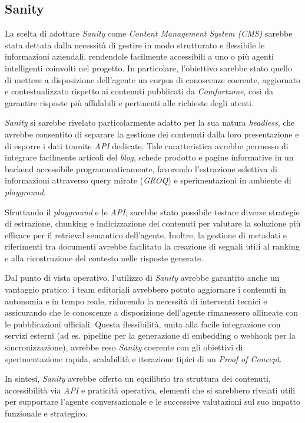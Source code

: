 \subsection{Sanity}

La scelta di adottare \emph{Sanity} come \emph{Content Management System (CMS)} sarebbe stata dettata dalla necessità di gestire in modo strutturato e flessibile le informazioni aziendali, 
rendendole facilmente accessibili a uno o più agenti intelligenti coinvolti nel progetto. 
In particolare, l’obiettivo sarebbe stato quello di mettere a disposizione dell’agente un corpus di conoscenze coerente, aggiornato e contestualizzato rispetto ai 
contenuti pubblicati da \emph{Comfortzone}, così da garantire risposte più affidabili e pertinenti alle richieste degli utenti.

\emph{Sanity} si sarebbe rivelato particolarmente adatto per la sua natura \emph{headless}, che avrebbe consentito di separare la gestione dei contenuti dalla loro 
presentazione e di esporre i dati tramite \emph{API} dedicate. Tale caratteristica avrebbe permesso di integrare facilmente articoli del \emph{blog}, 
schede prodotto e pagine informative in un backend accessibile programmaticamente, favorendo l’estrazione selettiva di informazioni attraverso query mirate (\emph{GROQ}) e 
sperimentazioni in ambiente di \emph{playground}.

Sfruttando il \emph{playground} e le \emph{API}, sarebbe stato possibile testare diverse strategie di estrazione, chunking e indicizzazione dei contenuti per valutare la soluzione più 
efficace per il retrieval semantico dell’agente. Inoltre, la gestione di metadati e riferimenti tra documenti avrebbe facilitato la creazione di segnali utili al ranking e alla 
ricostruzione del contesto nelle risposte generate.

Dal punto di vista operativo, l’utilizzo di \emph{Sanity} avrebbe garantito anche un vantaggio pratico: i team editoriali avrebbero potuto aggiornare i contenuti in autonomia e in tempo reale, 
riducendo la necessità di interventi tecnici e assicurando che le conoscenze a disposizione dell’agente rimanessero allineate con le pubblicazioni ufficiali. Questa flessibilità, 
unita alla facile integrazione con servizi esterni (ad es. pipeline per la generazione di embedding o webhook per la sincronizzazione), avrebbe reso \emph{Sanity} 
coerente con gli obiettivi di sperimentazione rapida, scalabilità e iterazione tipici di un \emph{Proof of Concept}.

In sintesi, \emph{Sanity} avrebbe offerto un equilibrio tra struttura dei contenuti, accessibilità via \emph{API} e praticità operativa, elementi che si sarebbero rivelati 
utili per supportare l’agente conversazionale e le successive valutazioni sul suo impatto funzionale e strategico.

